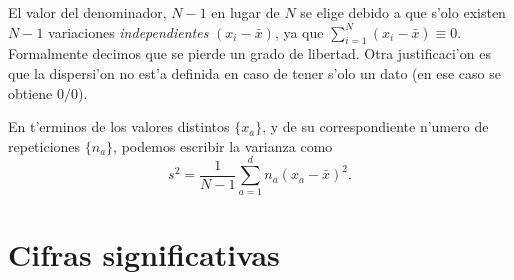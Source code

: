  El valor del denominador, $N-1$ en lugar de $N$ se elige debido a que s'olo existen $N-1$ variaciones \textit{independientes} $(x_i-\bar{x})$, ya que $\sum_{i=1}^N (x_i-\bar{x})\equiv 0$. Formalmente decimos que se pierde un grado de libertad. Otra justificaci'on es que la dispersi'on no est'a definida en caso de tener s'olo un dato (en ese caso se obtiene $0/0$).

En t'erminos de los valores distintos $\lbrace x_a\rbrace$, y de su correspondiente n'umero de repeticiones $\lbrace n_a\rbrace$, podemos escribir la varianza como
\begin{equation}
s^2=\frac{1}{N-1}\sum_{a=1}^{d}n_a(x_a-\bar{x})^2.
\end{equation}

%


\section{Cifras significativas}

